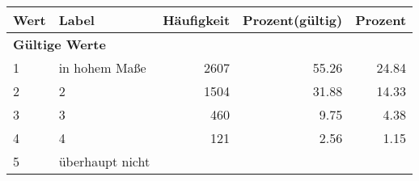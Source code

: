      \begin{longtable}{lXrrr}
     \toprule
     \textbf{Wert} & \textbf{Label} & \textbf{Häufigkeit} & \textbf{Prozent(gültig)} & \textbf{Prozent} \\
     \endhead
     \midrule
     \multicolumn{5}{l}{\textbf{Gültige Werte}}\\

     1 &
     \multicolumn{1}{X}{ in hohem Maße   } &


       \num{2607} &
       \num[round-mode=places,round-precision=2]{55,26} &
         \num[round-mode=places,round-precision=2]{24,84} \\

     2 &
     \multicolumn{1}{X}{ 2   } &


       \num{1504} &
       \num[round-mode=places,round-precision=2]{31,88} &
         \num[round-mode=places,round-precision=2]{14,33} \\

     3 &
     \multicolumn{1}{X}{ 3   } &


       \num{460} &
       \num[round-mode=places,round-precision=2]{9,75} &
         \num[round-mode=places,round-precision=2]{4,38} \\

     4 &
     \multicolumn{1}{X}{ 4   } &


       \num{121} &
       \num[round-mode=places,round-precision=2]{2,56} &
         \num[round-mode=places,round-precision=2]{1,15} \\

     5 &
     \multicolumn{1}{X}{ überhaupt nicht   } &



\end{longtable}
